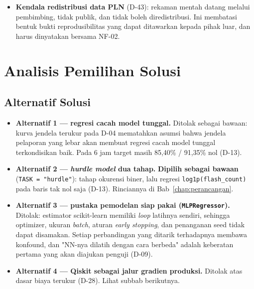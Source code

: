\begin{itemize}
\begin{itemize}
              \item satu lingkungan tersemat eksak di akar repositori
                    (D-41), diverifikasi pada Python 3.13.7 dengan 3.10 sebagai
                    lantai;
              \item \texttt{data/processed/} dapat dibangun ulang dengan satu
                    perintah.
          \end{itemize}
    \item \textbf{Kendala redistribusi data PLN} (D-43): rekaman mentah datang
          melalui pembimbing, tidak publik, dan tidak boleh diredistribusi.
          Ini membatasi bentuk bukti reprodusibilitas yang dapat ditawarkan
          kepada pihak luar, dan harus dinyatakan bersama NF-02.
\end{itemize}

\section{Analisis Pemilihan Solusi}

\subsection{Alternatif Solusi}

\begin{itemize}
    \item \textbf{Alternatif 1 --- regresi cacah model tunggal.} Ditolak sebagai
          bawaan: kurva jendela terukur pada D-04 mematahkan asumsi bahwa
          jendela pelaporan yang lebar akan membuat regresi cacah model tunggal
          terkondisikan baik. Pada 6 jam target masih 85,40\% / 91,35\% nol
          (D-13).
    \item \textbf{Alternatif 2 --- \textit{hurdle model} dua tahap.}
          \textbf{Dipilih sebagai bawaan} (\texttt{TASK = "hurdle"}): tahap
          okurensi biner, lalu regresi \texttt{log1p(flash\_count)} pada baris
          tak nol saja (D-13). Rinciannya di Bab~\ref{chap:perancangan}.
    \item \textbf{Alternatif 3 --- pustaka pemodelan siap pakai
          (\texttt{MLPRegressor}).} Ditolak: estimator scikit-learn memiliki
          \textit{loop} latihnya sendiri, sehingga optimizer, ukuran
          \textit{batch}, aturan \textit{early stopping}, dan penanganan seed
          tidak dapat disamakan. Setiap perbandingan yang ditarik terhadapnya
          membawa konfound, dan "NN-nya dilatih dengan cara berbeda" adalah
          keberatan pertama yang akan diajukan penguji (D-09).
    \item \textbf{Alternatif 4 --- Qiskit sebagai jalur gradien produksi.}
          Ditolak atas dasar biaya terukur (D-28). Lihat subbab berikutnya.
\end{itemize}

